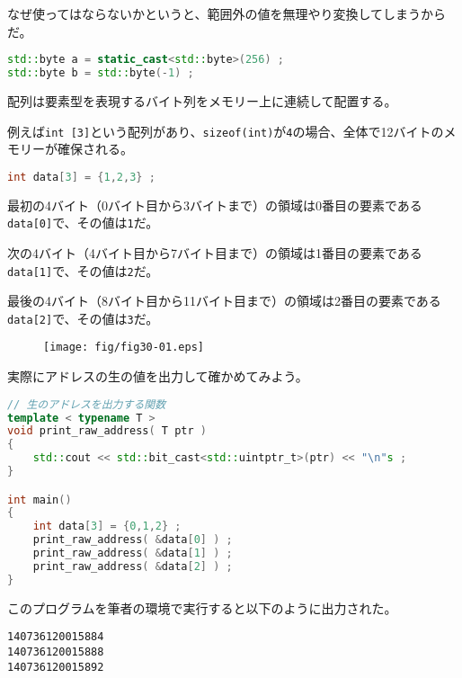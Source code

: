 なぜ使ってはならないかというと、範囲外の値を無理やり変換してしまうからだ。

\begin{lstlisting}[language={C++}]
std::byte a = static_cast<std::byte>(256) ;
std::byte b = std::byte(-1) ;
\end{lstlisting}


配列は要素型を表現するバイト列をメモリー上に連続して配置する。

例えば\texttt{int [3]}という配列があり、\texttt{sizeof(int)}が\texttt{4}の場合、全体で12バイトのメモリーが確保される。

\begin{lstlisting}[language={C++}]
int data[3] = {1,2,3} ;
\end{lstlisting}

最初の4バイト（0バイト目から3バイトまで）の領域は0番目の要素である\texttt{data[0]}で、その値は\texttt{1}だ。

次の4バイト（4バイト目から7バイト目まで）の領域は1番目の要素である\texttt{data[1]}で、その値は\texttt{2}だ。

最後の4バイト（8バイト目から11バイト目まで）の領域は2番目の要素である\texttt{data[2]}で、その値は\texttt{3}だ。

\begin{figure}[htbp]
  \centering
  \texttt{[image: fig/fig30-01.eps]}
  \label{fig:30-01}
\end{figure}

実際にアドレスの生の値を出力して確かめてみよう。

\begin{lstlisting}[language={C++}]
// 生のアドレスを出力する関数
template < typename T >
void print_raw_address( T ptr )
{
    std::cout << std::bit_cast<std::uintptr_t>(ptr) << "\n"s ;
}

int main()
{
    int data[3] = {0,1,2} ;
    print_raw_address( &data[0] ) ;
    print_raw_address( &data[1] ) ;
    print_raw_address( &data[2] ) ;
}
\end{lstlisting}

このプログラムを筆者の環境で実行すると以下のように出力された。

\begin{lstlisting}[style=terminal]
140736120015884
140736120015888
140736120015892
\end{lstlisting}

